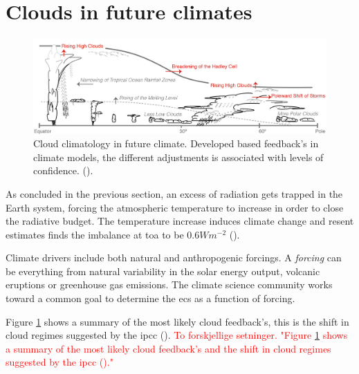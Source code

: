 
\section{Clouds in future climates} \label{sec:intro_cloud_future_climates}
\begin{figure}[h]
    \centering
    \includegraphics[scale = 0.8]{Chapter1_Intro/images/Fig7-11_ipcc.jpg}
    \caption{Cloud climatology in future climate. Developed based feedback's in climate models, the different adjustments is associated with levels of confidence.  (\cite{IPCC_CH7_clouds}).}
    \label{fig:cloud_scheme}
\end{figure}
As concluded in the previous section, an excess of radiation gets trapped in the Earth system, forcing the atmospheric temperature to increase in order to close the radiative budget. The temperature increase induces climate change and resent estimates finds the imbalance at \acrshort{toa} to be $0.6 Wm^{-2}$ (\cite{Wild2019TheModels}).

Climate drivers include both natural and anthropogenic forcings. A \textit{forcing} can be everything from natural variability in the solar energy output, volcanic eruptions or greenhouse gas emissions. The climate science community works toward a common goal to determine the \acrshort{ecs} as a function of forcing. %

Figure \ref{fig:cloud_scheme} shows a summary of the most likely cloud feedback's, this is the shift in cloud regimes suggested by the \acrshort{ipcc} (\cite{IPCC_CH7_clouds}). \textcolor{red}{To forskjellige setninger. "Figure \ref{fig:cloud_scheme} shows a summary of the most likely cloud feedback's and the shift in cloud regimes suggested by the \acrshort{ipcc} (\cite{IPCC_CH7_clouds})."}

